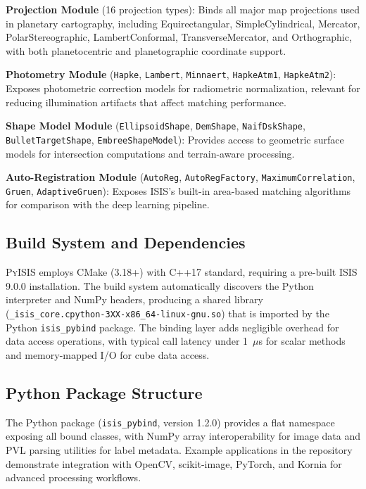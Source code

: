 \documentclass[lettersize,journal]{IEEEtran}
\newcommand{\pyisis}{\textsc{PyISIS}}
\begin{document}
\textbf{Projection Module} (16 projection types): Binds all major map projections used in planetary cartography, including Equirectangular, SimpleCylindrical, Mercator, PolarStereographic, LambertConformal, TransverseMercator, and Orthographic, with both planetocentric and planetographic coordinate support.

\textbf{Photometry Module} (\texttt{Hapke}, \texttt{Lambert}, \texttt{Minnaert}, \texttt{HapkeAtm1}, \texttt{HapkeAtm2}): Exposes photometric correction models for radiometric normalization, relevant for reducing illumination artifacts that affect matching performance.

\textbf{Shape Model Module} (\texttt{EllipsoidShape}, \texttt{DemShape}, \texttt{NaifDskShape}, \texttt{BulletTargetShape}, \texttt{EmbreeShapeModel}): Provides access to geometric surface models for intersection computations and terrain-aware processing.

\textbf{Auto-Registration Module} (\texttt{AutoReg}, \texttt{AutoRegFactory}, \texttt{MaximumCorrelation}, \texttt{Gruen}, \texttt{AdaptiveGruen}): Exposes ISIS's built-in area-based matching algorithms for comparison with the deep learning pipeline.

\subsection{Build System and Dependencies}

\pyisis{} employs CMake (3.18+) with C++17 standard, requiring a pre-built ISIS 9.0.0 installation. The build system automatically discovers the Python interpreter and NumPy headers, producing a shared library (\texttt{\_isis\_core.cpython-3XX-x86\_64-linux-gnu.so}) that is imported by the Python \texttt{isis\_pybind} package. The binding layer adds negligible overhead for data access operations, with typical call latency under 1~$\mu$s for scalar methods and memory-mapped I/O for cube data access.

\subsection{Python Package Structure}

The Python package (\texttt{isis\_pybind}, version 1.2.0) provides a flat namespace exposing all bound classes, with NumPy array interoperability for image data and PVL parsing utilities for label metadata. Example applications in the repository demonstrate integration with OpenCV, scikit-image, PyTorch, and Kornia for advanced processing workflows.
\end{document}
